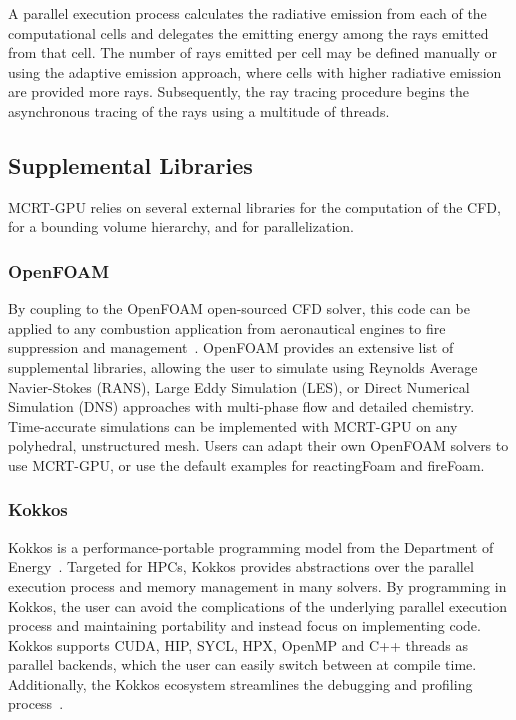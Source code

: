 A parallel execution process calculates the radiative emission from each of the computational cells and delegates the emitting energy among the rays emitted from that cell. The number of rays emitted per cell may be defined manually or using the adaptive emission approach, where cells with higher radiative emission are provided more rays. Subsequently, the ray tracing procedure begins the asynchronous tracing of the rays using a multitude of threads.

\subsection{Supplemental Libraries}\label{section:SupplementalLibraries}
MCRT-GPU relies on several external libraries for the computation of the CFD, for a bounding volume hierarchy, and for parallelization.

\subsubsection{OpenFOAM}
By coupling to the OpenFOAM open-sourced CFD solver, this code can be applied to any combustion application from aeronautical engines to fire suppression and management~\cite{Weller1998ATechniques}. OpenFOAM provides an extensive list of supplemental libraries, allowing the user to simulate using Reynolds Average Navier-Stokes (RANS), Large Eddy Simulation (LES), or Direct Numerical Simulation (DNS) approaches with multi-phase flow and detailed chemistry. 
Time-accurate simulations can be implemented with MCRT-GPU on any polyhedral, unstructured mesh.
Users can adapt their own OpenFOAM solvers to use MCRT-GPU, or use the default examples for reactingFoam and fireFoam.

\subsubsection{Kokkos}
Kokkos is a performance-portable programming model from the Department of Energy~\cite{Trott_Kokkos3_2022,TrottKokkosOGPaper2014}. 
Targeted for HPCs, Kokkos provides abstractions over the parallel execution process and memory management in many solvers. By programming in Kokkos, the user can avoid the complications of the underlying parallel execution process and maintaining portability and instead focus on implementing code.
Kokkos supports CUDA, HIP, SYCL, HPX, OpenMP and C++ threads as parallel backends, which the user can easily switch between at compile time.
Additionally, the Kokkos ecosystem streamlines the debugging and profiling process~\cite{Trott_KokkosEcosystem2021}.

